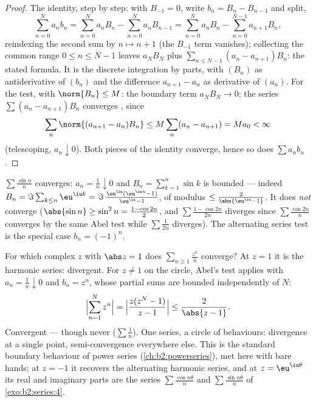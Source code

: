 \begin{proof}
The identity, step by step: with $B_{-1} = 0$, write $b_n = B_n -
B_{n-1}$ and split,
\[
\sum_{n=0}^{N} a_nb_n
= \sum_{n=0}^{N} a_nB_n - \sum_{n=0}^{N} a_nB_{n-1}
= \sum_{n=0}^{N} a_nB_n - \sum_{n=0}^{N-1} a_{n+1}B_{n} ,
\]
reindexing the second sum by $n \mapsto n + 1$ (the $B_{-1}$
term vanishes); collecting the common range $0 \leq n \leq N-1$
leaves $a_NB_N$ plus $\sum_{n\leq N-1}(a_n - a_{n+1})B_n$: the
stated formula. It is the discrete integration by parts, with
$(B_n)$ as antiderivative of $(b_n)$ and the difference $a_{n+1}
- a_n$ as derivative of $(a_n)$. For the test, with $\norm{B_n}
\leq M$: the
boundary term $a_N B_N \to 0$; the series $\sum (a_n -
a_{n+1})B_n$ converges , since
\[
\sum_n \norm{(a_{n+1} - a_n)B_n} \leq M \sum_n (a_n - a_{n+1})
= M a_0 < \infty
\]
(telescoping, $a_n \downarrow 0$). Both pieces of the identity
converge, hence so does $\sum a_n b_n$.
\end{proof}

\begin{example}\label{ex:b2:series:sinn}
$\sum \frac{\sin n}{n}$ converges: $a_n = \frac1n \downarrow 0$ and
$B_n = \sum_{k=1}^{n} \sin k$ is bounded --- indeed $B_n =
\Im\sum_{k \leq n} \eu^{\iu k} = \Im\,\frac{\eu^{\iu}(\eu^{\iu n} -
1)}{\eu^{\iu} - 1}$, of modulus $\leq \frac{2}{\abs{\eu^{\iu} - 1}}$.
It does \emph{not} converge  ($\abs{\sin n} \geq \sin^2 n
= \frac{1 - \cos 2n}{2}$, and $\sum \frac{1 - \cos 2n}{2n}$ diverges
since $\sum \frac{\cos 2n}{n}$ converges by the same Abel test while
$\sum \frac{1}{2n}$ diverges). The alternating series test is the
special case $b_n = (-1)^n$.
\end{example}

\begin{example}\label{ex:b2:series:abelboundary}
For which complex $z$ with $\abs z = 1$ does $\sum_{n \geq 1}
\frac{z^n}{n}$ converge? At $z = 1$ it is the harmonic series:
divergent. For $z \neq 1$ on the circle, Abel's test applies
with $a_n = \frac1n \downarrow 0$ and $b_n = z^n$, whose partial
sums are bounded independently of $N$:
\[
\Bigl|\sum_{n=1}^{N} z^n\Bigr|
= \Bigl|\frac{z(z^N - 1)}{z - 1}\Bigr|
\leq \frac{2}{\abs{z - 1}} .
\]
Convergent --- though never  ($\sum\frac1n$). One
series, a circle of behaviours: divergence at a single point,
semi-convergence everywhere else. This is the standard boundary
behaviour of power series (\cref{ch:b2:powerseries}), met here
with bare hands; at $z = -1$ it recovers the alternating
harmonic series, and at $z = \eu^{\iu\theta}$ its real and
imaginary parts are the series $\sum\frac{\cos
n\theta}{n}$ and $\sum\frac{\sin n\theta}{n}$ of
\cref{exo:b2:series:4}.
\end{example}

